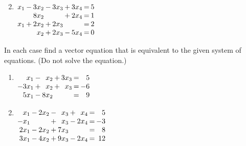 \begin{multicols}{2}
\begin{ex}
\begin{enumerate}[leftmargin=1em,label={\alph*.}]
\end{enumerate}
\begin{sol}
\begin{enumerate}[label={\alph*.}]
\setcounter{enumi}{1}
\item  
$\arraycolsep=1pt
\begin{array}[t]{rrrrrrrrr}
x_{1} & - & 3x_{2} & - & 3x_{3} & + & 3x_{4} & = & 5 \\
 &  & 8x_{2} &  &  & + & 2x_{4} & = & 1 \\
x_{1} & + & 2x_{2} & + & 2x_{3} &  &  & = & 2 \\
&  & x_{2} & + & 2x_{3} & - & 5x_{4} & = & 0 \\
\end{array}$


\end{enumerate}
\end{sol}
\end{ex}

\begin{ex}
In each case find a vector equation that is equivalent to the given system of equations. (Do not solve the equation.)


\begin{enumerate}[label={\alph*.}]
\item 
$ \arraycolsep=1pt
\begin{array}[t]{rrrrrrr}
x_{1} & - & x_{2} & + & 3x_{3} & = & 5 \\
-3x_{1} & + & x_{2} & + & x_{3} & = & -6 \\
5x_{1} & - & 8x_{2} & & & = & 9
\end{array}
$


\item
$ \arraycolsep=1pt
\begin{array}[t]{rrrrrrrrr}
x_{1} & - & 2x_{2} & - & x_{3} & + & x_{4} & = & 5 \\
-x_{1} &  &  & + & x_{3} &  - & 2x_{4} & = & -3 \\
2x_{1} & - & 2x_{2} & + & 7x_{3} & & & = & 8 \\
3x_{1} & - & 4x_{2} & + & 9x_{3} & - & 2x_{4} & = & 12
\end{array}
$




\end{enumerate}
\end{ex}
\end{multicols}
